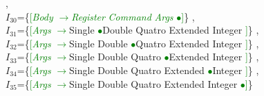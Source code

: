 \documentclass[a0]{a0poster}
\begin{document}
,\\
$I_{30}$=\{\textcolor{Green}{[}\textcolor{Green}{\textit{Body}} \textcolor{Green}{$\to$}\textcolor{Green}{\textit{Register}} \textcolor{Green}{\textit{Command}} \textcolor{Green}{\textit{Args}} \textcolor{Green}{$\bullet$}\textcolor{Green}{]}\}
,\\
$I_{31}$=\{\textcolor{Green}{[}\textcolor{Green}{\textit{Args}} \textcolor{Green}{$\to$}Single \textcolor{Green}{$\bullet$}Double Quatro Extended Integer \textcolor{Green}{]}\}
,\\
$I_{32}$=\{\textcolor{Green}{[}\textcolor{Green}{\textit{Args}} \textcolor{Green}{$\to$}Single Double \textcolor{Green}{$\bullet$}Quatro Extended Integer \textcolor{Green}{]}\}
,\\
$I_{33}$=\{\textcolor{Green}{[}\textcolor{Green}{\textit{Args}} \textcolor{Green}{$\to$}Single Double Quatro \textcolor{Green}{$\bullet$}Extended Integer \textcolor{Green}{]}\}
,\\
$I_{34}$=\{\textcolor{Green}{[}\textcolor{Green}{\textit{Args}} \textcolor{Green}{$\to$}Single Double Quatro Extended \textcolor{Green}{$\bullet$}Integer \textcolor{Green}{]}\}
,\\
$I_{35}$=\{\textcolor{Green}{[}\textcolor{Green}{\textit{Args}} \textcolor{Green}{$\to$}Single Double Quatro Extended Integer \textcolor{Green}{$\bullet$}\textcolor{Green}{]}\}
\end{document}

